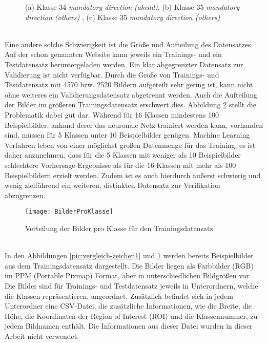 \begin{figure} [ht]
	\centering
	\subfloat[][]{\texttt{[image: 34]}}%
	\qquad
	\subfloat[][]{\texttt{[image: 35]}}%
	\qquad
	\subfloat[][]{\texttt{[image: 35-2]}}%
	\caption{(a) Klasse 34 \textit{mandatory direction (ahead)}, (b) Klasse 35 \textit{mandatory direction (others)} , (c) Klasse 35 \textit{mandatory direction (others)}}%
	\label{pic:vergleich-zeichen2}
\end{figure} \ \\
%
Eine andere solche Schwierigkeit ist die Größe und Aufteilung des Datensatzes. Auf der schon genannten Website kann jeweils ein Trainings- und ein Testdatensatz heruntergeladen werden. Ein klar abgegrenzter Datensatz zur Validierung ist nicht verfügbar. Durch die Größe von Trainings- und Testdatensatz mit 4570 bzw. 2520 Bildern aufgeteilt sehr gering ist, kann nicht ohne weiteres ein Validierungsdatensatz abgetrennt werden. Auch die Aufteilung der Bilder im größeren Trainingsdatensatz erschwert dies. Abbildung \ref{pic:picsproclass} stellt die Problematik dabei gut dar. Während für 16 Klassen mindestens 100 Beispielbilder, anhand derer das neuronale Netz trainiert werden kann, vorhanden sind, müssen für 5 Klassen unter 10 Beispielbilder genügen. Machine Learning Verfahren leben von einer möglichst großen Datenmenge für das Training, es ist daher anzunehmen, dass für die 5 Klassen mit weniger als 10 Beispielbilder schlechtere Vorhersage-Ergebnisse als für die 16 Klassen mit mehr als 100 Beispielbildern erzielt werden. Zudem ist es auch hierdurch äußerst schwierig und wenig zielführend ein weiteren, distinkten Datensatz zur Verifikation abzugrenzen. 

\begin{figure} [ht]
	\centering
	\texttt{[image: BilderProKlasse]}
	\caption{Verteilung der Bilder pro Klasse für den Trainingsdatensatz}
	\label{pic:picsproclass}
\end{figure} \ \\
%
In den Abbildungen \ref{pic:vergleich-zeichen1} und \ref{pic:vergleich-zeichen2} werden bereits Beispielbilder aus dem Trainingsdatensatz dargestellt. Die Bilder liegen als Farbbilder (RGB) im PPM (Portable Pixmap) Format, aber in unterschiedlichen Bildgrößen vor. Die Bilder sind für Trainings- und Testdatensatz jeweils in Unterordnern, welche die Klassen repräsentieren, angeordnet. Zusätzlich befindet sich in jedem Unterordner eine CSV-Datei, die zusätzliche Informationen, wie die Breite, die Höhe, die Koordinaten der Region of Interest (ROI) und die Klassennummer, zu jedem Bildnamen enthält. Die Informationen aus dieser Datei wurden in dieser Arbeit nicht verwendet. 

